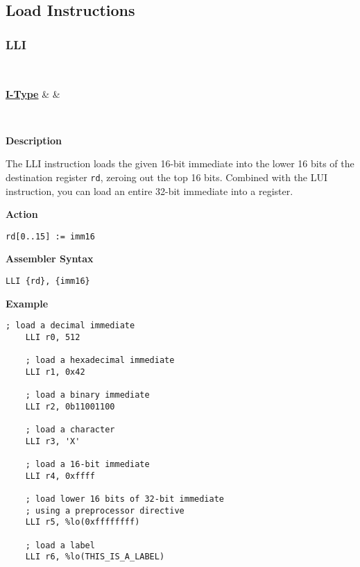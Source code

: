 \subsection{Load Instructions}

\subsubsection{LLI }\label{sec:LLI}

\vspace{3ex}

\begin{center}
	\begin{bytefield}[leftcurly=., leftcurlyspace=0pt]{32}
		 \\
		\begin{leftwordgroup}{\hyperref[sec:i-type]{\textbf{I-Type}}}
		 & 
		 &
		\end{leftwordgroup}\\
	\end{bytefield}
\end{center}

\textbf{Description}

The LLI instruction loads the given 16-bit immediate into the lower 16 bits of the destination register \texttt{rd}, zeroing out the top 16 bits.
Combined with the LUI instruction, you can load an entire 32-bit immediate into a register.

\vspace{3ex}

\textbf{Action}
\begin{lstlisting}[frame=single]
	rd[0..15] := imm16
\end{lstlisting}

\vspace{3ex}

\textbf{Assembler Syntax}
\begin{lstlisting}[frame=single]
	LLI {rd}, {imm16}
\end{lstlisting}

\vspace{3ex}

\textbf{Example}
\begin{lstlisting}[frame=single]
	; load a decimal immediate
	LLI r0, 512
	
	; load a hexadecimal immediate
	LLI r1, 0x42
	
	; load a binary immediate
	LLI r2, 0b11001100
	
	; load a character
	LLI r3, 'X'
	
	; load a 16-bit immediate
	LLI r4, 0xffff
	
	; load lower 16 bits of 32-bit immediate
	; using a preprocessor directive
	LLI r5, %lo(0xffffffff)
	
	; load a label
	LLI r6, %lo(THIS_IS_A_LABEL)
\end{lstlisting}


